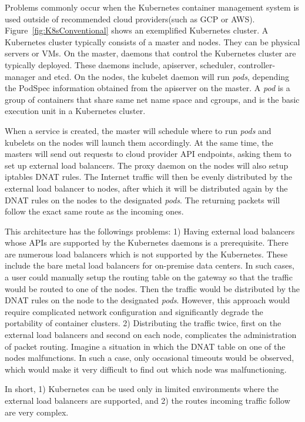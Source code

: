 Problems commonly occur when the Kubernetes container management system is used outside of recommended cloud providers(such as GCP or AWS).
Figure~\ref{fig:K8sConventional} shows an exemplified Kubernetes cluster.
A Kubernetes cluster typically consists of a master and nodes. They can be physical servers or VMs.
On the master, daemons that control the Kubernetes cluster are typically deployed. 
These daemons include, apiserver, scheduler, controller-manager and etcd. 
On the nodes, the kubelet daemon will run {\it pods}, depending the PodSpec information obtained from the apiserver on the master.
A {\em pod} is a group of containers that share same net name space and cgroups, 
and is the basic execution unit in a Kubernetes cluster.

When a service is created, the master will schedule where to run {\em pods} and kubelets on the nodes will launch them accordingly.
At the same time, the masters will send out requests to cloud provider API endpoints, asking them to set up external load balancers.
The proxy daemon on the nodes will also setup iptables DNAT\cite{MartinA.Brown2017} rules. 
The Internet traffic will then be evenly distributed by the external load balancer to nodes, 
after which it will be distributed again by the DNAT rules on the nodes to the designated {\em pods}. 
The returning packets will follow the exact same route as the incoming ones.

This architecture has the followings problems: 
1) Having external load balancers whose APIs are supported by the Kubernetes daemons is a prerequisite. 
There are numerous load balancers which is not supported by the Kubernetes.
These include the bare metal load balancers for on-premise data centers.  
In such cases, a user could manually setup the routing table on the gateway so that the traffic would be routed to one of the nodes.
Then the traffic would be distributed by the DNAT rules on the node to the designated {\em pods}.
However, this approach would require complicated network configuration and significantly degrade the portability of container clusters.
2) Distributing the traffic twice, first on the external load balancers and second on each node, 
complicates the administration of packet routing. 
Imagine a situation in which the DNAT table on one of the nodes malfunctions.
In such a case, only occasional timeouts would be observed, which would make it very difficult to find out which node was malfunctioning.   

In short, 1) Kubernetes can be used only in limited environments where the external load balancers are supported, 
and 2) the routes incoming traffic follow are very complex.

